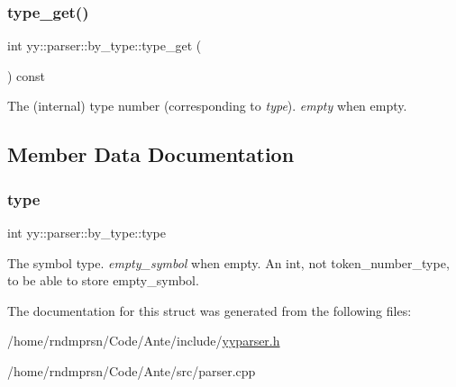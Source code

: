 \subsubsection{\texorpdfstring{type\+\_\+get()}{type\_get()}}
{\footnotesize\ttfamily int yy\+::parser\+::by\+\_\+type\+::type\+\_\+get (\begin{DoxyParamCaption}{ }\end{DoxyParamCaption}) const\hspace{0.3cm}{\ttfamily [inline]}}

The (internal) type number (corresponding to {\itshape type}). {\itshape empty} when empty. 

\subsection{Member Data Documentation}
\mbox{\label{structyy_1_1parser_1_1by__type_ae935bfe082da55acbfb798b2527e70d3}} 
\subsubsection{\texorpdfstring{type}{type}}
{\footnotesize\ttfamily int yy\+::parser\+::by\+\_\+type\+::type}

The symbol type. {\itshape empty\+\_\+symbol} when empty. An int, not token\+\_\+number\+\_\+type, to be able to store empty\+\_\+symbol. 

The documentation for this struct was generated from the following files\+:\begin{DoxyCompactItemize}
\item 
/home/rndmprsn/\+Code/\+Ante/include/\hyperlink{yyparser_8h}{yyparser.\+h}\item 
/home/rndmprsn/\+Code/\+Ante/src/parser.\+cpp\end{DoxyCompactItemize}
